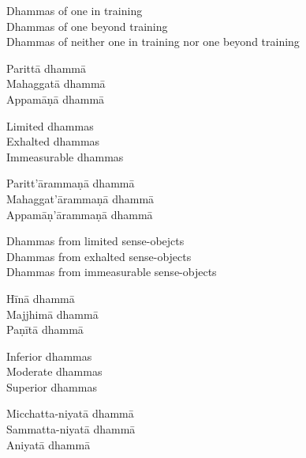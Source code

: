 \begin{english-verses}
  Dhammas of one in training\\
  Dhammas of one beyond training\\
  Dhammas of neither one in training nor one beyond training
\end{english-verses}

\begin{pali-hang-continued}
Parittā dhammā\\
Mahaggatā dhammā\\
Appamāṇā dhammā
\end{pali-hang-continued}

\begin{english-verses}
  Limited dhammas\\
  Exhalted dhammas\\
  Immeasurable dhammas
\end{english-verses}

\begin{pali-hang-continued}
Paritt'ārammaṇā dhammā\\
Mahaggat'ārammaṇā dhammā\\
Appamāṇ'ārammaṇā dhammā
\end{pali-hang-continued}

\begin{english-verses}
  Dhammas from limited sense-obejcts\\
  Dhammas from exhalted sense-objects\\
  Dhammas from immeasurable sense-objects
\end{english-verses}

\begin{pali-hang-continued}
Hīnā dhammā\\
Majjhimā dhammā\\
Paṇītā dhammā
\end{pali-hang-continued}

\begin{english-verses}
  Inferior dhammas\\
  Moderate dhammas\\
  Superior dhammas
\end{english-verses}

\begin{pali-hang-continued}
Micchatta-niyatā dhammā\\
Sammatta-niyatā dhammā\\
Aniyatā dhammā
\end{pali-hang-continued}

